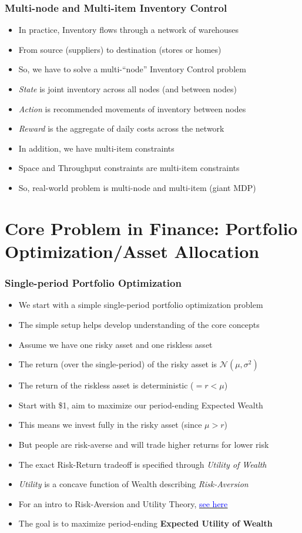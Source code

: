 \documentclass[handout]{beamer}
\begin{document}
\begin{frame}
\frametitle{Multi-node and Multi-item Inventory Control}
\pause
\begin{itemize}[<+->]
\item In practice, Inventory flows through a network of warehouses
\item From source (suppliers) to destination (stores or homes)
\item So, we have to solve a multi-``node'' Inventory Control problem
\item {\em State} is joint inventory across all nodes (and between nodes)
\item {\em Action} is recommended movements of inventory between nodes
\item {\em Reward} is the aggregate of daily costs across the network
\item In addition, we have multi-item constraints
\item Space and Throughput constraints are multi-item constraints
\item So, real-world problem is multi-node and multi-item (giant MDP)
\end{itemize}
\end{frame}

\section{Core Problem in Finance: Portfolio Optimization/Asset Allocation}

\begin{frame}
\frametitle{Single-period Portfolio Optimization}
\pause
\begin{itemize}[<+->]
\item We start with a simple single-period portfolio optimization problem
\item The simple setup helps develop understanding of the core concepts
\item Assume we have one risky asset and one riskless asset
\item The return (over the single-period) of the risky asset is $\mathcal{N}(\mu, \sigma^2)$
\item The return of the riskless asset is deterministic ($=r < \mu$)
\item Start with \$1, aim to maximize our period-ending Expected Wealth
\item This means we invest fully in the risky asset (since $\mu > r$)
\item But people are risk-averse and will trade higher returns for lower risk
\item The exact Risk-Return tradeoff is specified through {\em Utility of Wealth}
\item {\em Utility} is a concave function of Wealth describing {\em Risk-Aversion}
\item For an intro to Risk-Aversion and Utility Theory, \href{https://github.com/coverdrive/technical-documents/blob/master/finance/cme241/UtilityTheoryForRisk.pdf}{\underline{\textcolor{blue}{see here}}}
\item The goal is to maximize period-ending {\bf Expected Utility of Wealth}
\end{itemize}
\end{frame}
\end{document}
